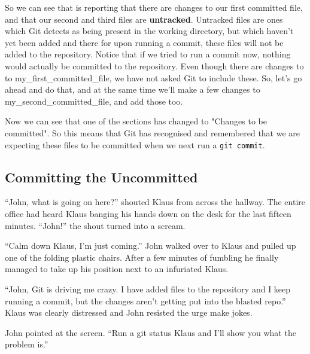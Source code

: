 So we can see that  is reporting that there are changes to our first committed file, and that our second and third files are \textbf{untracked}.
Untracked files are ones which Git detects as being present in the working directory, but which haven't yet been added and there for upon running a commit, these files will not be added to the repository.
Notice that if we tried to run a commit now, nothing would actually be committed to the repository.
Even though there are changes to to my\_first\_committed\_file, we have not asked Git to include these.
So, let's go ahead and do that, and at the same time we'll make a few changes to my\_second\_committed\_file, and add those too.


Now we can see that one of the sections has changed to "Changes to be committed".
So this means that Git has recognised and remembered that we are expecting these files to be committed when we next run a \texttt{git commit}.

\subsection{Committing the Uncommitted}

\begin{trenches}
``John, what is going on here?'' shouted Klaus from across the hallway.
The entire office had heard Klaus banging his hands down on the desk for the last fifteen minutes.
``John!'' the shout turned into a scream.

``Calm down Klaus, I'm just coming.''
John walked over to Klaus and pulled up one of the folding plastic chairs.
After a few minutes of fumbling he finally managed to take up his position next to an infuriated Klaus.

``John, Git is driving me crazy. I have added files to the repository and I keep running a commit, but the changes aren't getting put into the blasted repo.''
Klaus was clearly distressed and John resisted the urge make jokes.

John pointed at the screen.
``Run a git status Klaus and I'll show you what the problem is.''
\end{trenches}


